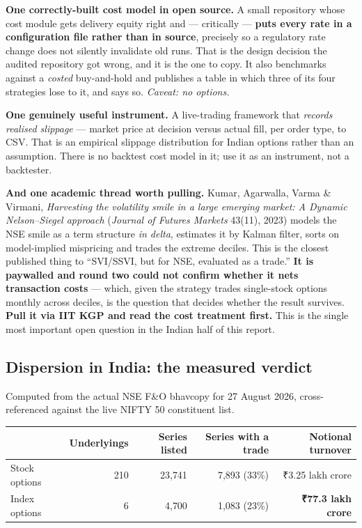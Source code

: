 \documentclass[11pt,a4paper]{article}
\newcommand{\rs}{₹}
\begin{document}
\textbf{One correctly-built cost model in open source.} A small repository whose
cost module gets delivery equity right and --- critically --- \textbf{puts every
rate in a configuration file rather than in source}, precisely so a regulatory
rate change does not silently invalidate old runs. That is the design decision the
audited repository got wrong, and it is the one to copy. It also benchmarks
against a \emph{costed} buy-and-hold and publishes a table in which three of its
four strategies lose to it, and says so. \emph{Caveat: no options.}

\textbf{One genuinely useful instrument.} A live-trading framework that
\emph{records realised slippage} --- market price at decision versus actual fill,
per order type, to CSV. That is an empirical slippage distribution for Indian
options rather than an assumption. There is no backtest cost model in it; use it
as an instrument, not a backtester.

\textbf{And one academic thread worth pulling.} Kumar, Agarwalla, Varma \&
Virmani, \emph{Harvesting the volatility smile in a large emerging market: A
Dynamic Nelson--Siegel approach} (\emph{Journal of Futures Markets} 43(11), 2023)
models the NSE smile as a term structure \emph{in delta}, estimates it by Kalman
filter, sorts on model-implied mispricing and trades the extreme deciles. This is
the closest published thing to ``SVI/SSVI, but for NSE, evaluated as a trade.''
\textbf{It is paywalled and round two could not confirm whether it nets
transaction costs} --- which, given the strategy trades single-stock options
monthly across deciles, is the question that decides whether the result survives.
\textbf{Pull it via IIT KGP and read the cost treatment first.} This is the single
most important open question in the Indian half of this report.

\subsection{Dispersion in India: the measured verdict}
\label{sec:dispersion}

Computed from the actual NSE F\&O bhavcopy for 27 August 2026, cross-referenced
against the live NIFTY 50 constituent list.

\begin{center}
\begin{tabular}{@{}lrrrr@{}}
\toprule
& Underlyings & Series listed & Series with a trade & Notional turnover \\
\midrule
Stock options & 210 & 23{,}741 & 7{,}893 (33\%) & \rs 3.25 lakh crore \\
Index options & 6 & 4{,}700 & 1{,}083 (23\%) & \textbf{\rs 77.3 lakh crore} \\
\bottomrule
\end{tabular}
\end{center}
\end{document}
